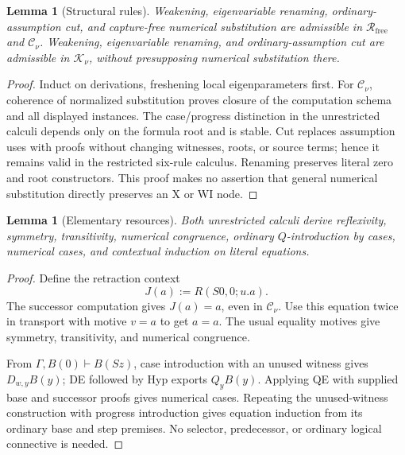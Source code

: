\documentclass[11pt]{article}
\newtheorem{lemma}[theorem]{Lemma}
\theoremstyle{definition}\newtheorem{definition}[theorem]{Definition}
\newcommand{\Rfree}{\mathcal R_{\mathrm{free}}}
\newcommand{\Cnorm}{\mathcal C_\nu}
\newcommand{\Knorm}{\mathcal K_\nu}
\begin{document}
\begin{lemma}[Structural rules]\label{cr:struct}
Weakening, eigenvariable renaming, ordinary-assumption cut, and capture-free numerical substitution are admissible in \(\Rfree\) and \(\Cnorm\).
Weakening, eigenvariable renaming, and ordinary-assumption cut are admissible in \(\Knorm\), without presupposing numerical substitution there.
\end{lemma}
\begin{proof}
Induct on derivations, freshening local eigenparameters first. For \(\Cnorm\), coherence of normalized substitution proves closure of the computation schema and all displayed instances. The case/progress distinction in the unrestricted calculi depends only on the formula root and is stable. Cut replaces assumption uses with proofs without changing witnesses, roots, or source terms; hence it remains valid in the restricted six-rule calculus. Renaming preserves literal zero and root constructors. This proof makes no assertion that general numerical substitution directly preserves an X or WI node.
\end{proof}

\begin{lemma}[Elementary resources]\label{cr:resources}
Both unrestricted calculi derive reflexivity, symmetry, transitivity, numerical congruence, ordinary \(Q\)-introduction by cases, numerical cases, and contextual induction on literal equations.
\end{lemma}
\begin{proof}
Define the retraction context
\[
J(a):=R(S0,0;u.a).
\]
The successor computation gives \(J(a)=a\), even in \(\Cnorm\). Use this equation twice in transport with motive \(v=a\) to get \(a=a\). The usual equality motives give symmetry, transitivity, and numerical congruence.

From \(\Gamma,B(0)\vdash B(Sz)\), case introduction with an unused witness gives \(D_{w,y}B(y)\); DE followed by Hyp exports \(Q_yB(y)\). Applying QE with supplied base and successor proofs gives numerical cases. Repeating the unused-witness construction with progress introduction gives equation induction from its ordinary base and step premises. No selector, predecessor, or ordinary logical connective is needed.
\end{proof}
\end{document}
